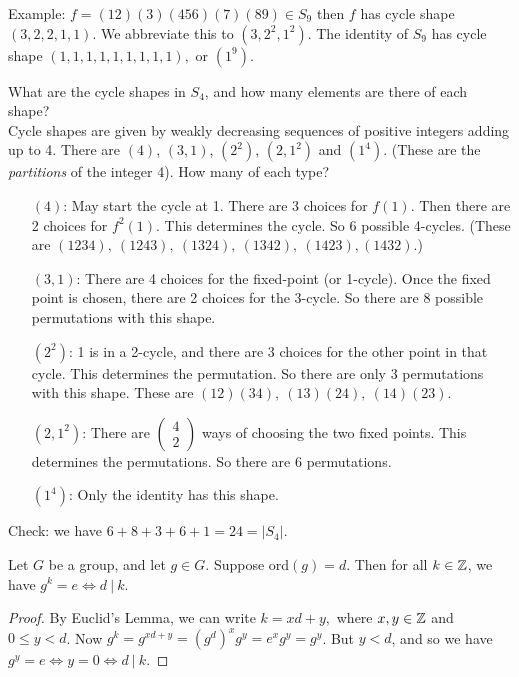 \documentclass[twoside]{scrartcl}
\begin{document}
Example: $f = (12)(3)(456)(7)(89) \in S_9$ then $f$ has cycle shape $(3,2,2,1,1)$. We abbreviate this to $(3,2^2,1^2).$ The identity of $S_9$ has cycle shape $(1,1,1,1,1,1,1,1,1),$ or  $(1^9)$.\\


\begin{examples}What are the cycle shapes in $S_4$, and how many elements are there of each shape?\\

Cycle shapes are given by weakly decreasing sequences of positive integers adding up to 4. There are $(4)$, $(3,1)$, $(2^2)$, $(2,1^2)$ and $(1^4)$. (These are the \emph{partitions} of the integer 4). How many of each type? \begin{itemize}
 \item[$(4)$:] May start the cycle at 1. There are 3 choices for $f(1)$. Then there are 2 choices for $f^2(1)$. This determines the cycle. So 6 possible 4-cycles. (These are $(1234),~(1243),~(1324),~(1342),~(1423),(1432)$.)
 \item[$(3,1)$:] There are 4 choices for the fixed-point (or 1-cycle).  Once the fixed point is chosen, there are 2 choices for the 3-cycle. So there are 8 possible permutations with this shape.
 \item[$(2^2)$:] 1 is in a 2-cycle, and there are 3 choices for the other point in that cycle. This determines the permutation. So there are only 3 permutations with this shape. These are $(12)(34),~(13)(24),~(14)(23)$.
 \item[$(2,1^2)$:] There are $\left(\begin{smallmatrix}
4 \\ 2	
\end{smallmatrix}\right)$ ways of choosing the two fixed points. This determines the permutations. So there are 6 permutations.
\item[$(1^4)$:] Only the identity has this shape. 
 \end{itemize}
 
 Check: we have $6 + 8 + 3 + 6 + 1 = 24 = |S_4|$.
\end{examples}


 
\begin{proposition} Let $G$ be a group, and let $g \in G$. Suppose ord$(g) = d$. Then for all $k\in \mathbb{Z}$, we have $g^k = e \iff d~|~k $.	
\end{proposition}

 
 \begin{proof}
 By Euclid's Lemma, we can write $k = xd + y,$ where $x,y \in \mathbb{Z}$ and $0 \leq y < d$. Now $g^k = g^{xd + y} = (g^d)^xg^y = e^xg^y = g^y$. But $y < d$, and so we have $g^y = e \iff y =0 \iff d~|~k$.
 \end{proof}\vspace*{10pt}
 
\end{document}
